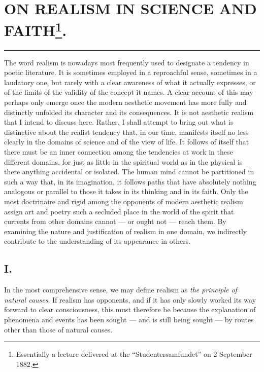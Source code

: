 \documentclass[12pt,a4paper,openany]{book}
\newcommand{\opage}[1]{\marginnote{\footnotesize\textit{[#1]}}}
\newcommand{\essay}[2][]{\chapter*{#2}\addcontentsline{toc}{chapter}{#1}}
\newcommand{\streg}{\begin{center}\rule{3em}{0.4pt}\end{center}}
\begin{document}
\opage{1}
\essay[On Realism in Science and Faith]{ON REALISM IN SCIENCE AND FAITH\footnote{Essentially a lecture delivered at the ``Studentersamfundet'' on 2 September 1882.}.}

\streg{}

The word realism is nowadays most frequently used to designate a tendency in poetic literature. It is sometimes employed in a reproachful sense, sometimes in a laudatory one, but rarely with a clear awareness of what it actually expresses, or of the limits of the validity of the concept it names. A clear account of this may perhaps only emerge once the modern aesthetic movement has more fully and distinctly unfolded its character and its consequences. It is not aesthetic realism that I intend to discuss here. Rather, I shall attempt to bring out what is distinctive about the realist tendency that, in our time, manifests itself no less clearly in the domains of science and of the view of life. It follows of itself that there must be an inner connection among the tendencies at work in these different domains, for just as little in the spiritual world as in the physical is there anything accidental or isolated. The human mind cannot be partitioned in such a way that, in its imagination, it follows paths that have absolutely nothing analogous or parallel to those it takes in its thinking and in its faith. Only the most doctrinaire and rigid among the opponents of modern aesthetic realism assign art and poetry such a secluded place in the world of the spirit that currents from other domains cannot --- or ought not --- reach them. By examining the nature and justification of realism in one domain, we indirectly contribute to the understanding of its appearance in others.

\opage{2}
\section*{I.}

In the most comprehensive sense, we may define realism as \emph{the principle of natural causes}. If realism has opponents, and if it has only slowly worked its way forward to clear consciousness, this must therefore be because the explanation of phenomena and events has been sought --- and is still being sought --- by routes other than those of natural causes.
\end{document}
